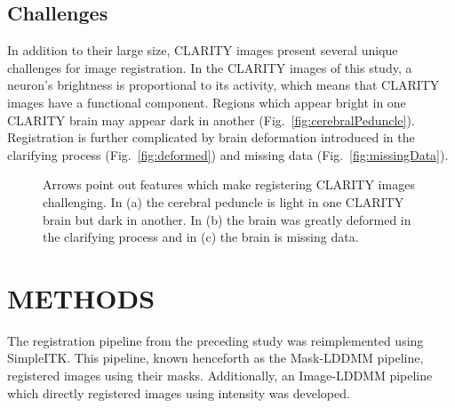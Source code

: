 \documentclass[]{spie}  %
\begin{document}
\subsection{Challenges}
In addition to their large size, CLARITY images present several unique challenges for image registration.
In the CLARITY images of this study, a neuron's brightness is proportional to its activity, which means that CLARITY images have a functional component.
Regions which appear bright in one CLARITY brain may appear dark in another (Fig.~\ref{fig:cerebralPeduncle}).
Registration is further complicated by brain deformation introduced in the clarifying process (Fig.~\ref{fig:deformed}) and missing data (Fig.~\ref{fig:missingData}).

\begin{figure}[ht]
 \centering
 \caption{Arrows point out features which make registering CLARITY images challenging.
          In (a) the cerebral peduncle is light in one CLARITY brain but dark in another.
          In (b) the brain was greatly deformed in the clarifying process and in (c) the brain is missing data.}
 \label{fig:challenges}
\end{figure}

\section{METHODS}
The registration pipeline from the preceding study \cite{Kutten} was reimplemented using SimpleITK.
This pipeline, known henceforth as the Mask-LDDMM pipeline, registered images using their masks.
Additionally, an Image-LDDMM pipeline which directly registered images using intensity was developed.
\end{document}
